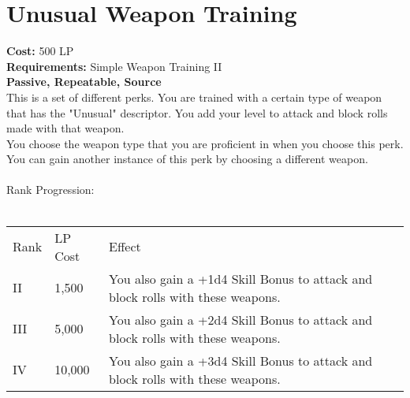 \section{Unusual Weapon Training}\label{perk:unusualWeaponTraining}
\textbf{Cost:} 500 LP\\
\textbf{Requirements:} Simple Weapon Training II\\
\textbf{Passive, Repeatable, Source}\\
This is a set of different perks.
You are trained with a certain type of weapon that has the "Unusual" descriptor.
You add your level to attack and block rolls made with that weapon.\\
You choose the weapon type that you are proficient in when you choose this perk.
You can gain another instance of this perk by choosing a different weapon.\\
\\
Rank Progression:\\
\\
\begin{longtable}{l | l | p{9cm}}
	Rank & LP Cost &Effect\\
	II & 1,500 & You also gain a +1d4 Skill Bonus to attack and block rolls with these weapons.\\
	III & 5,000 & You also gain a +2d4 Skill Bonus to attack and block rolls with these weapons.\\
	IV & 10,000 & You also gain a +3d4 Skill Bonus to attack and block rolls with these weapons.\\
\end{longtable}